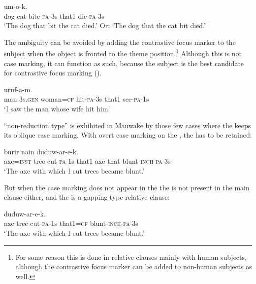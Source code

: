 \ea%
\label{ex:8:x1548}
  um-o-k. \\
dog  cat  bite-\textsc{pa}-3s that1 die-\textsc{pa}-3s\\
\glt`The dog that bit the cat died.' Or: `The dog that the cat bit died.'
\z


The ambiguity can be avoided by adding the contrastive focus marker to the subject when the object is fronted to the theme position.\footnote{For some reason this is done in relative clauses mainly with human subjects, although the contrastive focus marker can be added to non-human subjects as well.}  Although this is not case marking, it can function as such, because the subject is the best candidate for contrastive focus marking ().

\ea%
\label{ex:8:x1549}
\gll [Mua  ona  emeria=ke  aruf-a-k  nain]  uruf-a-m. \\
man  3s.\textsc{gen} woman=\textsc{cf} hit-\textsc{pa}-3s that1 see-\textsc{pa}-1s\\
\glt`I saw the man whose wife hit him.'
\z


 ``non-reduction type'' is exhibited in Mauwake by those few cases where the  keeps its oblique case marking. With overt case marking on the , the  has to be retained:

\ea%
\label{ex:8:x1544}
\gll [\textbf{Burir=iw}  nomokowa  war-em  nain,]  burir  nain  duduw-ar-e-k.\\
axe=\textsc{inst} tree cut-\textsc{pa}-1s that1 axe that blunt-\textsc{inch}-\textsc{pa}-3s\\
\glt`The axe with which I cut trees became blunt.'
\z
{}


But when the case marking does not appear in the  the  is not present in the main clause either, and the  is a gapping-type relative clause:

\ea%
\label{ex:8:x1541}
\gll [\textbf{Burir}  nomokowa  war-e-m  nain=ke]  duduw-ar-e-k. \\
axe  tree  cut-\textsc{pa}-1s that1=\textsc{cf} blunt-\textsc{inch}-\textsc{pa}-3s\\
\glt`The axe with which I cut trees became blunt.'
\z


